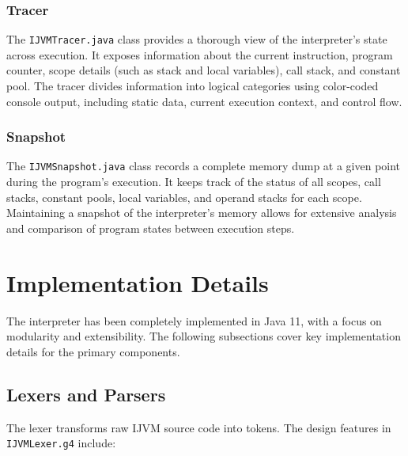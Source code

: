 \documentclass[11pt]{article}
\begin{document}
\subsubsection{Tracer}
The \texttt{IJVMTracer.java} class provides a thorough view of the interpreter's state across execution. It exposes information about the current instruction, program counter, scope details (such as stack and local variables), call stack, and constant pool. The tracer divides information into logical categories using color-coded console output, including static data, current execution context, and control flow.

\subsubsection{Snapshot}
The \texttt{IJVMSnapshot.java} class records a complete memory dump at a given point during the program's execution. It keeps track of the status of all scopes, call stacks, constant pools, local variables, and operand stacks for each scope.  Maintaining a snapshot of the interpreter's memory allows for extensive analysis and comparison of program states between execution steps.

\section{Implementation Details}
The interpreter has been completely implemented in Java 11, with a focus on modularity and extensibility. The following subsections cover key implementation details for the primary components.

\subsection{Lexers and Parsers}
 The lexer transforms raw IJVM source code into tokens.  The design features in \texttt{IJVMLexer.g4} include:
\end{document}
